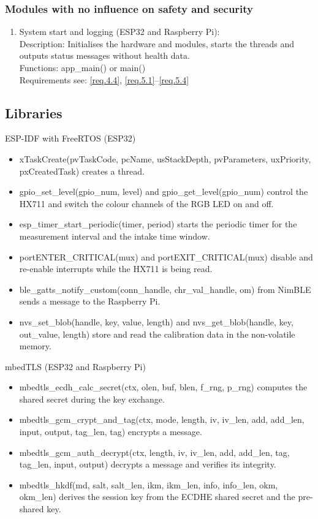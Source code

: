 \subsubsection{Modules with no influence on safety and security}
	\begin{enumerate}
		\item System start and logging (ESP32 and Raspberry Pi): \\
			Description: Initialises the hardware and modules, starts the
			threads and outputs status messages without health data. \\
			Functions: app\_main() or main() \\
			Requirements see: \ref{req.4.4}, \ref{req.5.1}--\ref{req.5.4}
	\end{enumerate}

\subsection{Libraries}

ESP-IDF with FreeRTOS (ESP32)
	\begin{itemize}
		\item xTaskCreate(pvTaskCode, pcName, usStackDepth, pvParameters,
		uxPriority, pxCreatedTask) creates a thread.
		\item gpio\_set\_level(gpio\_num, level) and gpio\_get\_level(gpio\_num)
		control the HX711 and switch the colour channels of the RGB LED on and
		off.
		\item esp\_timer\_start\_periodic(timer, period) starts the periodic
		timer for the measurement interval and the intake time window.
		\item portENTER\_CRITICAL(mux) and portEXIT\_CRITICAL(mux) disable and
		re-enable interrupts while the HX711 is being read.
		\item ble\_gatts\_notify\_custom(conn\_handle, chr\_val\_handle, om) from
		NimBLE sends a message to the Raspberry Pi.
		\item nvs\_set\_blob(handle, key, value, length) and nvs\_get\_blob(handle,
		key, out\_value, length) store and read the calibration data in the
		non-volatile memory.
	\end{itemize}

mbedTLS (ESP32 and Raspberry Pi)
	\begin{itemize}
		\item mbedtls\_ecdh\_calc\_secret(ctx, olen, buf, blen, f\_rng, p\_rng)
		computes the shared secret during the key exchange.
		\item mbedtls\_gcm\_crypt\_and\_tag(ctx, mode, length, iv, iv\_len, add,
		add\_len, input, output, tag\_len, tag) encrypts a message.
		\item mbedtls\_gcm\_auth\_decrypt(ctx, length, iv, iv\_len, add, add\_len,
		tag, tag\_len, input, output) decrypts a message and verifies its
		integrity.
		\item mbedtls\_hkdf(md, salt, salt\_len, ikm, ikm\_len, info, info\_len,
		okm, okm\_len) derives the session key from the ECDHE shared secret
		and the pre-shared key.
	\end{itemize}

